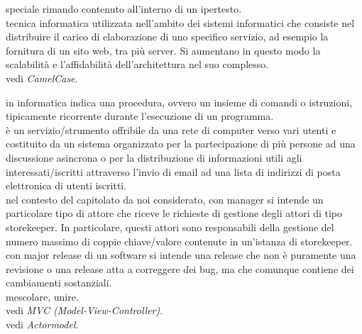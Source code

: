 \documentclass{scalatekids-article}
\begin{document}
   speciale rimando contenuto all'interno di un ipertesto.
  \\
  
   tecnica informatica utilizzata nell'ambito dei sistemi informatici che consiste nel distribuire il carico di elaborazione di uno specifico servizio, ad esempio la fornitura di un sito web, tra più server. Si aumentano in questo modo la scalabilità e l'affidabilità dell'architettura nel suo complesso.
  \\

   vedi \textit{CamelCase}.
  \\


   in informatica indica una procedura, ovvero un insieme di comandi o istruzioni, tipicamente ricorrente durante l'esecuzione di un programma.
  \\

   è un servizio/strumento offribile da una rete di computer verso vari utenti e costituito da un sistema organizzato per la partecipazione di più persone ad una discussione asincrona o per la distribuzione di informazioni utili agli interessati/iscritti attraverso l'invio di email ad una lista di indirizzi di posta elettronica di utenti iscritti.
  \\
  
   nel contesto del capitolato da noi considerato, con manager si intende un particolare tipo di attore che riceve le richieste di gestione degli attori di tipo storekeeper. In particolare, questi attori sono responsabili della gestione del numero massimo di coppie chiave/valore contenute in un’istanza di storekeeper.
  \\

   con major release di un software si intende una release che non è puramente una revisione o una release atta a correggere dei bug, ma che comunque contiene dei cambiamenti sostanziali.
  \\

   mescolare, unire.
  \\
  
   vedi \textit{MVC (Model-View-Controller)}.
  \\

   vedi \textit{Actormodel}.
  \\
\end{document}

